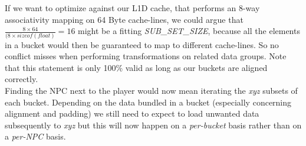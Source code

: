 If we want to optimize against our L1D cache, that performs an 8-way associativity mapping on 64 Byte cache-lines, we could argue that $\frac{8\times 64}{(8\times sizeof(float)} = 16$ might be a fitting \textit{SUB\_SET\_SIZE}, because all the elements in a bucket would then be guaranteed to map to different cache-lines. So no conflict misses when performing transformations on related data groups. Note that this statement is only 100\% valid as long as our buckets are aligned correctly.\\
Finding the NPC next to the player would now mean iterating the \textit{xyz} subsets of each bucket. Depending on the data bundled in a bucket (especially concerning alignment and padding) we still need to expect to load unwanted data subsequently to \textit{xyz} but this will now happen on a \textit{per-bucket} basis rather than on a \textit{per-NPC} basis.
